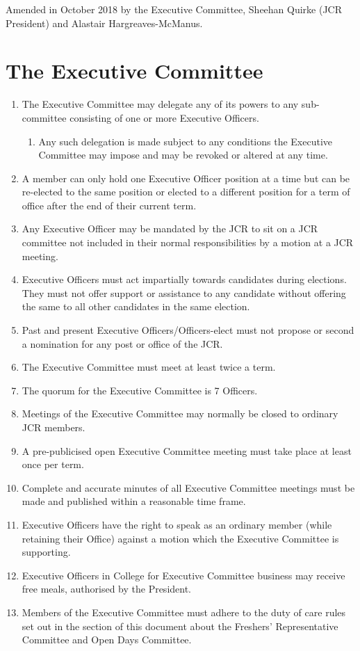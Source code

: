 \documentclass[12pt]{article}  %
\begin{document}
Amended in October 2018 by the Executive Committee, Sheehan Quirke (JCR President) and Alastair Hargreaves-McManus.
\newpage
\tableofcontents{}
\newpage


\section{The Executive Committee}
\begin{enumerate}
	\item The Executive Committee may delegate any of its powers to any sub-committee consisting of one or more Executive Officers.
	\begin{enumerate}
		\item Any such delegation is made subject to any conditions the Executive Committee may impose and may be revoked or altered at any time.
	\end{enumerate}
	\item A member can only hold one Executive Officer position at a time but can be re-elected to the same position or elected to a different position for a term of office after the end of their current term.
	\item Any Executive Officer may be mandated by the JCR to sit on a JCR committee not included in their normal responsibilities by a motion at a JCR meeting.
	\item Executive Officers must act impartially towards candidates during elections. They must not offer support or assistance to any candidate without offering the same to all other candidates in the same election.
	\item Past and present Executive Officers/Officers-elect must not propose or second a nomination for any post or office of the JCR.
	\item The Executive Committee must meet at least twice a term.
	\item The quorum for the Executive Committee is 7 Officers.
	\item Meetings of the Executive Committee may normally be closed to ordinary JCR members.
	\item A pre-publicised open Executive Committee meeting must take place at least once per term.
	\item Complete and accurate minutes of all Executive Committee meetings must be made and published within a reasonable time frame.
	\item Executive Officers have the right to speak as an ordinary member (while retaining their Office) against a motion which the Executive Committee is supporting.
	\item Executive Officers in College for Executive Committee business may receive free meals, authorised by the President.
	\item Members of the Executive Committee must adhere to the duty of care rules set out in the section of this document about the Freshers’ Representative Committee and Open Days Committee.

\end{enumerate}
\end{document}

